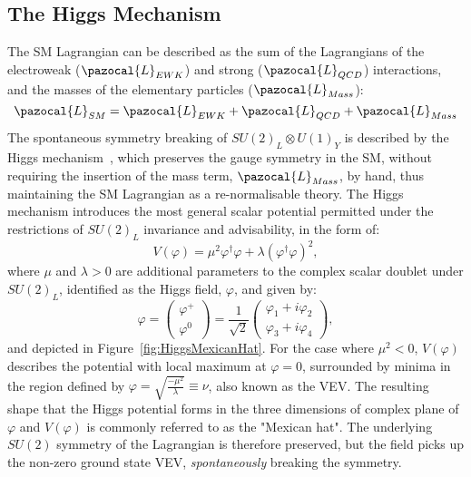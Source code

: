 	\subsection{The Higgs Mechanism}\label{subsec:HiggsMech}
	The \ac{SM} Lagrangian can be described as the sum of the Lagrangians of the electroweak ($\pazocal{L}_{EWK}$) and strong ($\pazocal{L}_{QCD}$) interactions, and the masses of the elementary particles ($\pazocal{L}_{Mass}$):
	\begin{equation}
	\pazocal{L}_{SM} = \pazocal{L}_{EWK} + \pazocal{L}_{QCD} + \pazocal{L}_{Mass}
	\end{equation}
	The spontaneous symmetry breaking of $SU(2)_L \otimes U(1)_Y$ is described by the Higgs mechanism~\cite{Higgs1964,Englert1964}, which preserves the gauge symmetry in the \ac{SM}, without requiring the insertion of the mass term, $\pazocal{L}_{Mass}$, by hand, thus maintaining the \ac{SM} Lagrangian as a re-normalisable theory.
	The Higgs mechanism introduces the most general scalar potential permitted under the restrictions of $SU(2)_L$ invariance and advisability, in the form of:
	\begin{equation}
	V(\varphi)=\mu^2\varphi^{\dagger}\varphi + \lambda(\varphi^{\dagger}\varphi)^2,
	\end{equation}
	where $\mu$ and $\lambda>0$ are additional parameters to the complex scalar doublet under $SU(2)_L$, identified as the Higgs field, $\varphi$, and given by:
	\begin{equation}
	\varphi = \begin{pmatrix} \varphi^+ \\ \varphi^0 \end{pmatrix} = \frac{1}{\sqrt{2}}\begin{pmatrix}  \varphi_1 + i\varphi_2 \\ \varphi_3 + i \varphi_4  \end{pmatrix},
	\end{equation}
	and depicted in Figure~\ref{fig:HiggsMexicanHat}. 
	\HiggsMexicanHat
	For the case where $\mu^2<0$, $V(\varphi)$ describes the potential with local maximum at $\varphi=0$, surrounded by minima in the region defined by $\varphi=\sqrt{\frac{-\mu^2}{\lambda}}\equiv \nu$, also known as the \ac{VEV}. 
	The resulting shape that the Higgs potential forms in the three dimensions of complex plane of $\varphi$ and $V(\varphi)$ is commonly referred to as the "Mexican hat".
	The underlying $SU(2)$ symmetry of the Lagrangian is therefore preserved, but the field picks up the non-zero ground state \ac{VEV}, \textit{spontaneously} breaking the symmetry.
	
